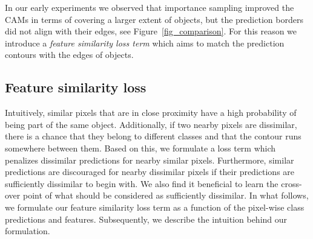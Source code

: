 \documentclass{article}
\begin{document}
In our early experiments we observed that importance sampling improved the CAMs in terms of covering a larger extent of objects, but the prediction borders did not align with their edges, see Figure~\ref{fig_comparison}. For this reason we introduce a \textit{feature similarity loss term} which aims to match the prediction contours with the edges of objects.

\subsection{Feature similarity loss}
\label{sec_feature_similarity_loss}

Intuitively, similar pixels that are in close proximity have a high probability of being part of the same object. Additionally, if two nearby pixels are dissimilar, there is a chance that they belong to different classes and that the contour runs somewhere between them. Based on this, we formulate a loss term which penalizes dissimilar predictions for nearby similar pixels. Furthermore, similar predictions are discouraged for nearby dissimilar pixels if their predictions are sufficiently dissimilar to begin with. We also find it beneficial to learn the cross-over point of what should be considered as sufficiently dissimilar. In what follows, we formulate our feature similarity loss term as a function of the pixel-wise class predictions and features. Subsequently, we describe the intuition behind our formulation.
\end{document}
